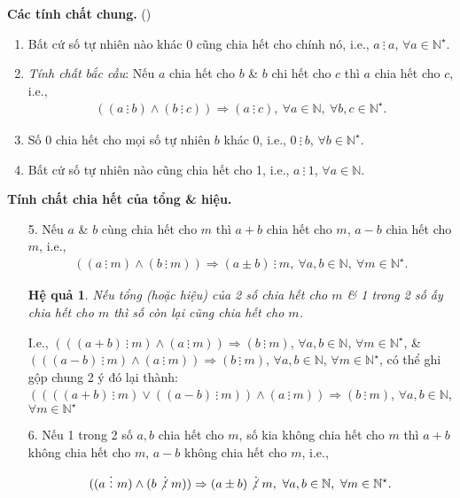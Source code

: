 \documentclass[oneside]{book}
\numberwithin{equation}{section}
\newtheorem{hequa}{Hệ quả}[section]
\begin{document}
\noindent\textbf{Các tính chất chung.} (\cite[\S3, p. 15]{Binh_Toan_6_tap_1})
\begin{enumerate}
	\item Bất cứ số tự nhiên nào khác 0 cũng chia hết cho chính nó, i.e., $a\ \vdots\ a$, $\forall a\in\mathbb{N}^\star$.
	\item \textit{Tính chất bắc cầu}: Nếu $a$ chia hết cho $b$ \& $b$ chi hết cho $c$ thì $a$ chia hết cho $c$, i.e.,
	\begin{align*}
		((a\ \vdots\ b)\land(b\ \vdots\ c))\Rightarrow(a\ \vdots\ c),\ \forall a\in\mathbb{N},\ \forall b,c\in\mathbb{N}^\star.
	\end{align*}
	\item Số 0 chia hết cho mọi số tự nhiên $b$ khác 0, i.e., $0\ \vdots\ b$, $\forall b\in\mathbb{N}^\star$.
	\item Bất cứ số tự nhiên nào cũng chia hết cho 1, i.e., $a\ \vdots\ 1$, $\forall a\in\mathbb{N}$.
\end{enumerate}
\noindent\textbf{Tính chất chia hết của tổng \& hiệu.}
\begin{enumerate}
	\item[5.] Nếu $a$ \& $b$ cùng chia hết cho $m$ thì $a + b$ chia hết cho $m$, $a - b$ chia hết cho $m$, i.e.,
	\begin{align*}
		((a\ \vdots\ m)\land(b\ \vdots\ m))\Rightarrow(a\pm b)\ \vdots\ m,\ \forall a,b\in\mathbb{N},\ \forall m\in\mathbb{N}^\star.
	\end{align*}
	
	\begin{hequa}
		Nếu tổng (hoặc hiệu) của 2 số chia hết cho $m$ \& 1 trong 2 số ấy chia hết cho $m$ thì số còn lại cũng chia hết cho $m$.
	\end{hequa}
	I.e., $(((a + b)\ \vdots\ m)\land(a\ \vdots\ m))\Rightarrow(b\ \vdots\ m)$, $\forall a,b\in\mathbb{N}$, $\forall m\in\mathbb{N}^\star$, \& $(((a - b)\ \vdots\ m)\land(a\ \vdots\ m))\Rightarrow(b\ \vdots\ m)$, $\forall a,b\in\mathbb{N}$, $\forall m\in\mathbb{N}^\star$, có thể ghi gộp chung 2 ý đó lại thành: $((((a + b)\ \vdots\ m)\lor((a - b)\ \vdots\ m))\land(a\ \vdots\ m))\Rightarrow(b\ \vdots\ m)$, $\forall a,b\in\mathbb{N}$, $\forall m\in\mathbb{N}^\star$
	\item[6.] Nếu 1 trong 2 số $a,b$ chia hết cho $m$, số kia không chia hết cho $m$ thì $a + b$ không chia hết cho $m$, $a - b$ không chia hết cho $m$, i.e.,
	\begin{align*}
		((a\ \vdots\ m)\land(b\not\vdots\ m))\Rightarrow(a\pm b)\not\vdots\ m,\ \forall a,b\in\mathbb{N},\ \forall m\in\mathbb{N}^\star.
	\end{align*}
\end{enumerate}
\end{document}
